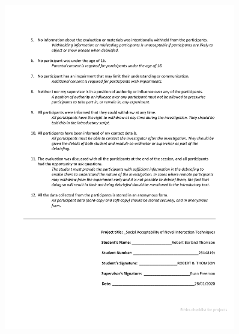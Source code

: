 \documentclass{l4proj}
\begin{document}
\begin{appendices}
\begin{figure}[h!]
    \includegraphics[width=0.9\textwidth]{images/Ethics check-signed2.pdf}
\end{figure}


\end{appendices}
\end{document}
